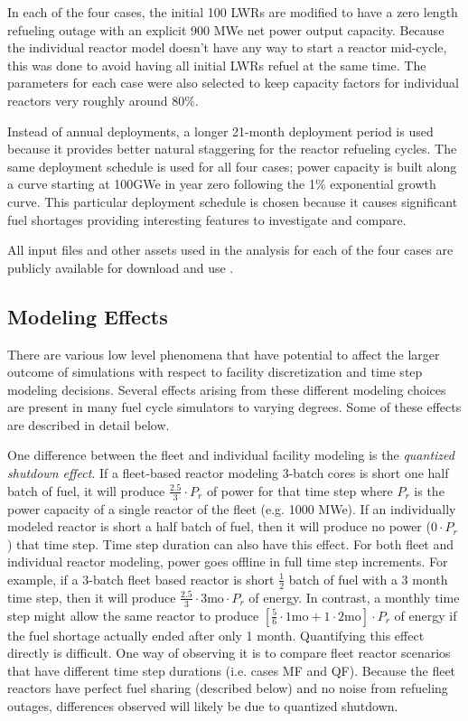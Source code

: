 \documentclass{style}
\begin{document}
In each of the four cases, the initial 100 LWRs are modified to have a zero
length refueling outage with an explicit 900 MWe net power output capacity.  Because the
individual reactor model doesn't have any way to start a reactor mid-cycle,
this was done to avoid having all initial LWRs refuel at the same time.  The
parameters for each case were also selected to keep capacity factors for
individual reactors very roughly around 80\%.

Instead of annual deployments, a longer 21-month deployment period is used
because it provides better natural staggering for the reactor refueling
cycles. The same deployment schedule is used for all four cases; power
capacity is built along a curve starting at 100GWe in year zero following the
1\% exponential growth curve.  This particular deployment schedule is chosen
because it causes significant fuel shortages providing interesting features to
investigate and compare.

All input files and other assets used in the analysis for each of the four
cases are publicly available for download and use \cite{Carlsen2015}.

\subsection{Modeling Effects}

There are various low level phenomena that have potential to affect the larger
outcome of simulations with respect to facility discretization and time step
modeling decisions. Several effects arising from these different modeling
choices are present in many fuel cycle simulators to varying degrees.  Some of
these effects are described in detail below.

One difference between the fleet and individual facility modeling is the
\emph{quantized shutdown effect}.  If a fleet-based reactor modeling 3-batch
cores is short one half batch of fuel, it will produce $\frac{2.5}{3}\cdot P_r$
of power for that time step where $P_r$ is the power capacity of a single
reactor of the fleet (e.g. 1000 MWe).  If an individually modeled reactor is
short a half batch of fuel, then it will produce no power ($0 \cdot P_r$) that
time step.  Time step duration can also have this effect.  For both fleet and
individual reactor modeling, power goes offline in full time step increments.
For example, if a 3-batch fleet based reactor is short $\frac{1}{2}$ batch of
fuel with a 3 month time step, then it will produce $\frac{2.5}{3} \cdot 3
\text{mo} \cdot P_r$ of energy.  In contrast, a monthly time step might allow
the same reactor to produce $[\frac{5}{6} \cdot 1 \text{mo} + 1 \cdot 2
\text{mo}] \cdot P_r $ of energy if the fuel shortage actually ended after only
1 month.  Quantifying this effect directly is difficult.  One way of observing
it is to compare fleet reactor scenarios that have different time step
durations (i.e. cases MF and QF).  Because the fleet reactors have perfect fuel
sharing (described below) and no noise from refueling outages, differences observed will
likely be due to quantized shutdown.
\end{document}
